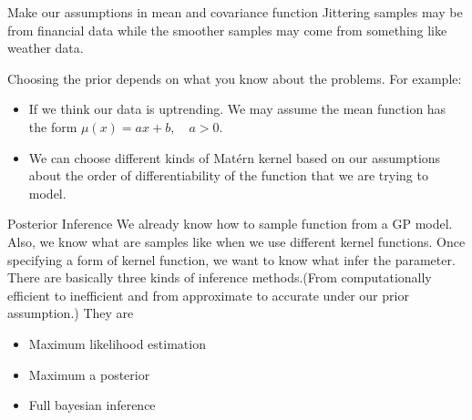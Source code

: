 \documentclass{beamer}
\begin{document}
\begin{frame}{Make our assumptions in mean and covariance function}
Jittering samples may be from financial data while the smoother samples may come from something like weather data.

Choosing the prior depends on what you know about the problems. For example:
\begin{itemize}
\item If we think our data is uptrending. We may assume the mean function has the form $\mu(x) = ax + b, \quad a > 0$.
\item We can choose different kinds of Matérn kernel based on our assumptions about the order of differentiability of the function that we are trying to model.
\end{itemize}
\end{frame}

\begin{frame}{Posterior Inference}
We already know how to sample function from a GP model. Also, we know what are samples like when we use different kernel functions. Once specifying a form of kernel function, we want to know what infer the parameter.
There are basically three kinds of inference methods.(From computationally efficient to inefficient and from approximate to accurate under our prior assumption.) They are 
\begin{itemize}
\item Maximum likelihood estimation
\item Maximum a posterior
\item Full bayesian inference
\end{itemize}
\end{frame}
\end{document}
